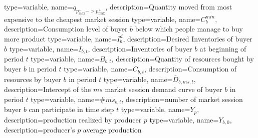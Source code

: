 {%
  type=variable,%
  name={$q_{p^+_{\max} -> p^+_{\max}}$},%
  description={Quantity moved from most expensive to the cheapest market session} 
}
{%
  type=variable,%
  name={$C^{min}_b$},%
  description={Consumption level of buyer $b$ below which people manage to buy more product} 
}
{%
  type=variable,%
  name={$I^d_b$},%
  description={Desired Inventories of buyer $b$} 
}
{%
  type=variable,%
  name={$I_{b,t}$},%
  description={Inventories of buyer $b$ at beginning of period $t$} 
}
{%
  type=variable,%
  name={$B_{b,t}$},%
  description={Quantity of resources bought by buyer $b$ in period $t$} 
}
{%
  type=variable,%
  name={$C_{b,t}$},%
  description={Consumption of resources by buyer $b$ in period $t$} 
}
{%
  type=variable,%
  name={$\bar{D}_{b,ms,t}$},%
  description={Intercept of the $ms$ market session demand curve of buyer $b$ in period $t$} 
}
{%
  type=variable,%
  name={$\#ms_{b,t}$},%
  description={number of market session buyer $b$ can participate in time step $t$} 
}
{%
  type=variable,%
  name={$Y_{p}$},%
  description={production realized by producer $p$} 
}
{%
  type=variable,%
  name={$Y_{b,0}$},%
  description={producer's $p$ average production} 
}


